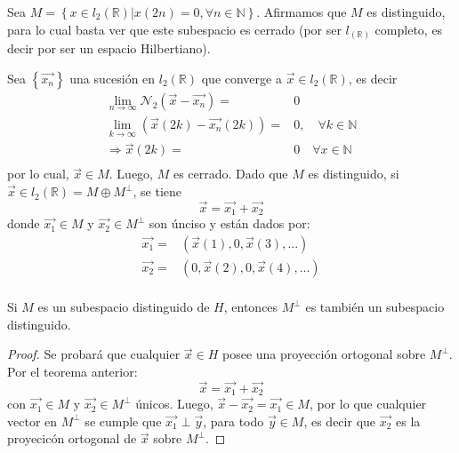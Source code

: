 \documentclass[12pt]{report}
\newcounter{it}
\theoremstyle{largebreak}
\begin{document}
    \begin{exa}
        Sea $M=\left\{x\in l_2(\mathbb{R})\big| x(2n)=0, \forall n\in\mathbb{N} \right\}$. Afirmamos que $M$ es distinguido, para lo cual basta ver que este subespacio es cerrado (por ser $l_(\mathbb{R})$ completo, es decir por ser un espacio Hilbertiano).

        Sea $\left\{\vec{x_n} \right\}$ una sucesión en $l_2(\mathbb{R})$ que converge a $\vec{x}\in l_2(\mathbb{R})$, es decir
        \begin{equation}
            \begin{split}
                \lim_{n\rightarrow \infty}\mathcal{N}_2(\vec{x}-\vec{x_n})=&0\\
                \lim_{k\rightarrow \infty}(\vec{x}(2k)-\vec{x_n}(2k))=&0,\quad \forall k\in\mathbb{N}\\
                \Rightarrow \vec{x}(2k)=&0\quad\forall x\in\mathbb{N}\\ 
            \end{split}
        \end{equation}
        por lo cual, $\vec{x}\in M$. Luego, $M$ es cerrado. Dado que $M$ es distinguido, si $\vec{x}\in l_2(\mathbb{R})=M\oplus M^\perp$, se tiene
        \begin{equation*}
            \vec{x}=\vec{x_1}+\vec{x_2}
        \end{equation*}
        donde $\vec{x_1}\in M$ y $\vec{x_2}\in M^\perp$ son únciso y están dados por:
        \begin{equation*}
            \begin{split}
                \vec{x_1}=&(\vec{x}(1),0,\vec{x}(3),...)\\
                \vec{x_2}=&(0,\vec{x}(2),0,\vec{x}(4),...)\\
            \end{split}
        \end{equation*}
    \end{exa}

    \begin{cor}
        Si $M$ es un subespacio distinguido de $H$, entonces $M^\perp$ es también un subespacio distinguido.
    \end{cor}

    \begin{proof}
        Se probará que cualquier $\vec{x}\in H$ posee una proyección ortogonal sobre $M^\perp$. Por el teorema anterior:
        \begin{equation*}
            \vec{x}=\vec{x_1}+\vec{x_2}
        \end{equation*}
        con $\vec{x_1}\in M$ y $\vec{x_2}\in M^\perp$ únicos. Luego, $\vec{x}-\vec{x_2}=\vec{x_1}\in M$, por lo que cualquier vector en $M^\perp$ se cumple que $\vec{x_1}\perp \vec{y}$, para todo $\vec{y}\in M$, es decir que $\vec{x_2}$ es la proyecicón ortogonal de $\vec{x}$ sobre $M^\perp$.
    \end{proof}
\end{document}
